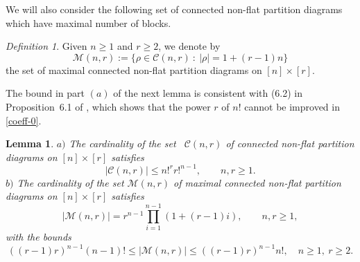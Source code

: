 \documentclass[bj,authoryear,noshowframe]{imsart}
\theoremstyle{plain}
\newtheorem{lemma}[theorem]{Lemma}
\theoremstyle{remark}
\newtheorem{definition}[theorem]{Definition}
\begin{document}
 \vspace{-1cm}
 
 \noindent
  We will also consider the following set of 
  connected non-flat partition diagrams which have maximal
  number of blocks. 
 
 \vspace{-0.2cm}
 
  \begin{definition} 
   \noindent
  Given $n\geq 1$ and $r\geq 2$,
 we denote by
 $$
  \mathcal{M}(n,r):=\{\rho\in \mathcal{C} (n,r)  \ : \ |\rho|= 1 + (r-1)n \}
   $$
  the set of maximal connected non-flat partition diagrams on $[n]\times[r]$.
 \end{definition}
 
 \vspace{-0.4cm}
 
 \noindent
  The bound in part $(a)$ of the next lemma is consistent with
  (6.2) in Proposition~6.1 of \cite{schulte-thaele},
  which shows that the power $r$ of $n!$ cannot be improved in \eqref{coeff-0}. 
 \begin{lemma}
   \label{fjkldsf-l}
   \noindent
   $a)$ The cardinality of the set \ $\mathcal{C} (n,r)$
  of connected non-flat partition diagrams on $[n]\times[r]$ satisfies 
  \begin{equation}
    \label{coeff-0}
   |\mathcal{C} (n,r) | \leq n!^r r!^{n-1}, 
   \qquad n,r \geq 1. 
 \end{equation}
 \noindent
 $b)$ 
  The cardinality of the set 
 $ \mathcal{M}(n,r)$
  of maximal connected non-flat partition diagrams on $[n]\times[r]$ satisfies 
 \begin{equation}\label{coeff-10}
   |\mathcal{M}(n,r)|=r^{n-1}\prod_{i=1}^{n-1}(1+(r-1)i),
   \qquad n,r\geq 1, 
 \end{equation}
  with the bounds 
 \begin{equation}\label{coeff-1}
     ( (r-1)r )^{n-1}(n-1)!\le
     |\mathcal{M}(n,r)|
      \leq ( (r-1)r )^{n-1}n!, \quad n\geq 1, \ r\geq 2. 
 \end{equation}
 \end{lemma}
\end{document}
